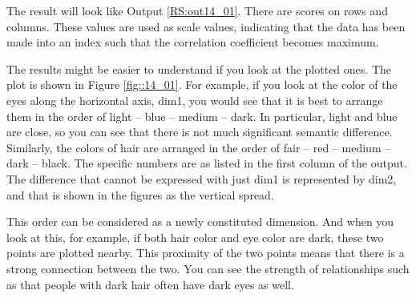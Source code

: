 \documentclass{ltjsbook}
\begin{document}
The result will look like Output \ref{RS:out14_01}. There are scores on rows and columns. These values are used as scale values, indicating that the data has been made into an index such that the correlation coefficient becomes maximum.


The results might be easier to understand if you look at the plotted ones. The plot is shown in Figure \ref{fig::14_01}.
For example, if you look at the color of the eyes along the horizontal axis, dim1, you would see that it is best to arrange them in the order of light -- blue -- medium -- dark. In particular, light and blue are close, so you can see that there is not much significant semantic difference.
Similarly, the colors of hair are arranged in the order of fair -- red -- medium -- dark -- black. The specific numbers are as listed in the first column of the output.
The difference that cannot be expressed with just dim1 is represented by dim2, and that is shown in the figures as the vertical spread.

This order can be considered as a newly constituted dimension.
And when you look at this, for example, if both hair color and eye color are dark, these two points are plotted nearby. This proximity of the two points means that there is a strong connection between the two. You can see the strength of relationships such as that people with dark hair often have dark eyes as well.


\end{document}

